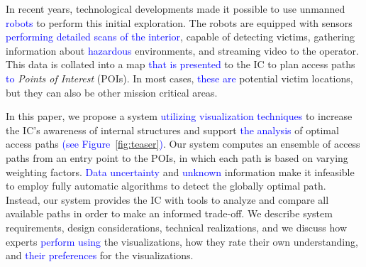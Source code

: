 \documentclass{egpubl}
\newcommand{\diff}[1]{\textcolor{blue}{#1}}
\begin{document}
In recent years, technological developments made it possible to use unmanned \diff{robots} to perform this initial exploration. The robots are equipped with sensors \diff{performing detailed scans of the interior}, capable of detecting victims, gathering information about \diff{hazardous} environments, and streaming video to the operator. This data is collated into a map \diff{that is presented} to the IC to plan access paths \diff{to} \emph{Points of Interest} (POIs). In most cases, \diff{these are} potential victim locations, but they can also be other mission critical areas.

In this paper, we propose a system \diff{utilizing visualization techniques} to increase the IC's awareness of internal structures and support \diff{the analysis} of optimal access paths \diff{(see Figure~\ref{fig:teaser})}. Our system computes an ensemble of access paths from an entry point to the POIs, in which each path is based on varying weighting factors. \diff{Data uncertainty} and \diff{unknown} information make it infeasible to employ fully automatic algorithms to detect the globally optimal path. Instead, our system provides the IC with tools to analyze and compare all available paths in order to make an informed trade-off. We describe system requirements, design considerations, technical realizations, and we discuss how experts \diff{perform using} the visualizations, how they rate their own understanding, and \diff{their preferences} for the visualizations.


\end{document}
